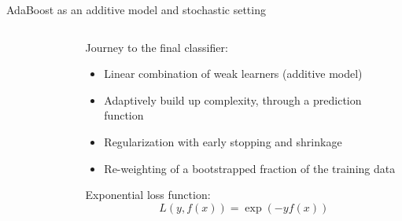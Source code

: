 \begin{frame}{AdaBoost as an additive model and stochastic setting}
\begin{columns}[T]
\begin{column}{0.48\textwidth}
\begin{figure}
\end{figure}
\end{column}
\begin{column}{0.48\textwidth}
\vspace{0.7em}
Journey to the final classifier:
{\footnotesize\begin{itemize}
	\setlength{\itemsep}{-0.8ex}
	\item Linear combination of \alert{weak learners} (additive model)
	\item Adaptively build up complexity, through a prediction function
	\item Regularization with early stopping and shrinkage
	\item \alert{Re-weighting} of a bootstrapped fraction of the training data  %
\end{itemize}}
\vspace{0.8em}
Exponential loss function:\vspace{-1ex}
\[L(y,f(x))=\exp(-yf(x))\]
\end{column}
\end{columns}

\end{frame}


